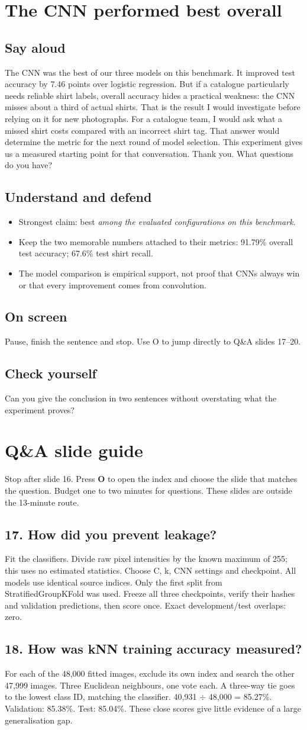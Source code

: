 \documentclass[11pt,a4paper]{article}
\newcommand{\slide}[3]{\clearpage{\small\color{olive}SLIDE #1\hfill Target: #3}\par\section{#2}}
\newcommand{\say}{\subsection{Say aloud}}
\newcommand{\understand}{\subsection{Understand and defend}}
\newcommand{\screen}{\subsection{On screen}}
\newcommand{\selfcheck}[1]{\subsection{Check yourself}#1}
\newcounter{question}
\begin{document}
\slide{16}{The CNN performed best overall}{45 seconds}
\say
The CNN was the best of our three models on this benchmark. It improved test accuracy by 7.46 points over logistic regression. But if a catalogue particularly needs reliable shirt labels, overall accuracy hides a practical weakness: the CNN misses about a third of actual shirts. That is the result I would investigate before relying on it for new photographs. For a catalogue team, I would ask what a missed shirt costs compared with an incorrect shirt tag. That answer would determine the metric for the next round of model selection. This experiment gives us a measured starting point for that conversation. Thank you. What questions do you have?
\understand
\begin{itemize}
\item Strongest claim: best \emph{among the evaluated configurations on this benchmark}.
\item Keep the two memorable numbers attached to their metrics: 91.79\% overall test accuracy; 67.6\% test shirt recall.
\item The model comparison is empirical support, not proof that CNNs always win or that every improvement comes from convolution.
\end{itemize}
\screen
Pause, finish the sentence and stop. Use O to jump directly to Q\&A slides 17--20.
\selfcheck{Can you give the conclusion in two sentences without overstating what the experiment proves?}

\clearpage\section{Q\&A slide guide}
Stop after slide 16. Press \textbf{O} to open the index and choose the slide that matches the question. Budget one to two minutes for questions. These slides are outside the 13-minute route.

\subsection{17. How did you prevent leakage?}
Fit the classifiers. Divide raw pixel intensities by the known maximum of 255; this uses no estimated statistics. Choose C, k, CNN settings and checkpoint. All models use identical source indices. Only the first split from StratifiedGroupKFold was used. Freeze all three checkpoints, verify their hashes and validation predictions, then score once. Exact development/test overlaps: zero.
\subsection{18. How was kNN training accuracy measured?}
For each of the 48,000 fitted images, exclude its own index and search the other 47,999 images. Three Euclidean neighbours, one vote each. A three-way tie goes to the lowest class ID, matching the classifier. 40,931 $\div$ 48,000 = 85.27\%. Validation: 85.38\%. Test: 85.04\%. These close scores give little evidence of a large generalisation gap.
\end{document}
